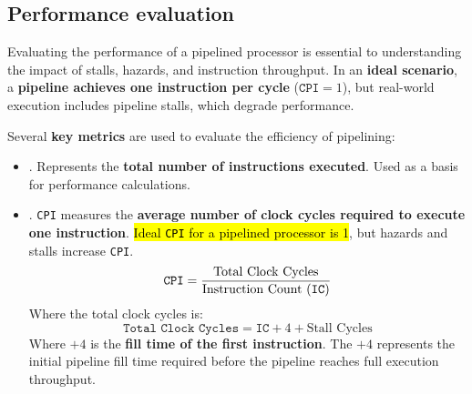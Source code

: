 \subsection{Performance evaluation}

Evaluating the performance of a pipelined processor is essential to understanding the impact of stalls, hazards, and instruction throughput. In an \textbf{ideal scenario}, a \textbf{pipeline achieves one instruction per cycle} ($\texttt{CPI} = 1$), but real-world execution includes pipeline stalls, which degrade performance.

\highspace
Several \textbf{key metrics} are used to evaluate the efficiency of pipelining:
\begin{itemize}
   \item {}. Represents the \textbf{total number of instructions executed}. Used as a basis for performance calculations.
   
   \item {}. \texttt{CPI} measures the \textbf{average number of clock cycles required to execute one instruction}. \hl{Ideal \texttt{CPI} for a pipelined processor is 1}, but hazards and stalls increase \texttt{CPI}.
   \begin{equation}
      \texttt{CPI} = \dfrac{
         \text{Total Clock Cycles}
      }{
         \text{Instruction Count (\texttt{IC})}
      }
   \end{equation}
   Where the total clock cycles is:
   \begin{equation}
      \texttt{Total Clock Cycles} = \texttt{IC} + 4 + \text{Stall Cycles}
   \end{equation}
   Where $+4$ is the \textbf{fill time of the first instruction}. The $+4$ represents the initial pipeline fill time required before the pipeline reaches full execution throughput.


\end{itemize}
